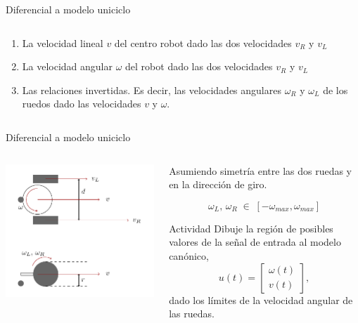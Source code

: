 \documentclass[presentation,aspectratio=169]{beamer}
\begin{document}
\begin{frame}[label={sec:orga45f18e}]{Diferencial a modelo uniciclo}
\begin{columns}
\begin{column}{0.6\columnwidth}
\begin{enumerate}
\item La velocidad lineal \(v\) del centro robot dado las dos velocidades \(v_R\) y \(v_L\)

\item La velocidad angular \(\omega\) del robot dado las dos velocidades \(v_R\) y \(v_L\)

\item Las relaciones invertidas. Es decir, las velocidades angulares \(\omega_R\) y \(\omega_L\) de los ruedos dado las velocidades \(v\) y \(\omega\).
\end{enumerate}
\end{column}
\end{columns}
\end{frame}


\begin{frame}[label={sec:org7af4ead}]{Diferencial a modelo uniciclo}
\begin{columns}
\begin{column}{0.4\columnwidth}
\begin{center}
 \includegraphics[width=.8\linewidth]{../figures/unicycle-model-details}
\end{center}
\end{column}

\begin{column}{0.6\columnwidth}
Asumiendo simetría entre las dos ruedas y en la dirección de giro.

\[ \omega_L,\, \omega_R \; \in \; [-\omega_{max}, \omega_{max}]\]

\pause

\alert{Actividad}
Dibuje la región de posibles valores de la señal de entrada al modelo canónico,
\[ u(t) = \begin{bmatrix} \omega(t)\\v(t) \end{bmatrix}, \]
dado los límites de la velocidad angular de las ruedas.
\end{column}
\end{columns}
\end{frame}
\end{document}
